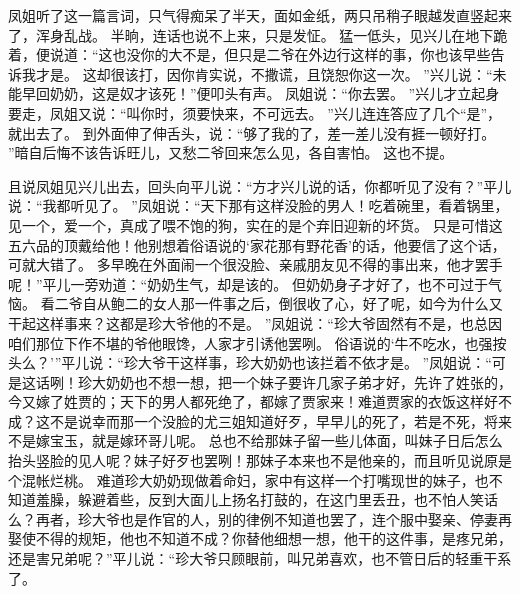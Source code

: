 \par
凤姐听了这一篇言词，只气得痴呆了半天，面如金纸，两只吊稍子眼越发直竖起来了，浑身乱战。
半晌，连话也说不上来，只是发怔。
猛一低头，见兴儿在地下跪着，便说道：“这也没你的大不是，但只是二爷在外边行这样的事，你也该早些告诉我才是。
这却很该打，因你肯实说，不撒谎，且饶恕你这一次。
”兴儿说：“未能早回奶奶，这是奴才该死！”便叩头有声。
凤姐说：“你去罢。
”兴儿才立起身要走，凤姐又说：“叫你时，须要快来，不可远去。
”兴儿连连答应了几个“是”，就出去了。
到外面伸了伸舌头，说：“够了我的了，差一差儿没有捱一顿好打。
”暗自后悔不该告诉旺儿，又愁二爷回来怎么见，各自害怕。
这也不提。
\par
且说凤姐见兴儿出去，回头向平儿说：“方才兴儿说的话，你都听见了没有？”平儿说：“我都听见了。
”凤姐说：“天下那有这样没脸的男人！吃着碗里，看着锅里，见一个，爱一个，真成了喂不饱的狗，实在的是个弃旧迎新的坏货。
只是可惜这五六品的顶戴给他！他别想着俗语说的‘家花那有野花香’的话，他要信了这个话，可就大错了。
多早晚在外面闹一个很没脸、亲戚朋友见不得的事出来，他才罢手呢！”平儿一旁劝道：“奶奶生气，却是该的。
但奶奶身子才好了，也不可过于气恼。
看二爷自从鲍二的女人那一件事之后，倒很收了心，好了呢，如今为什么又干起这样事来？这都是珍大爷他的不是。
”凤姐说：“珍大爷固然有不是，也总因咱们那位下作不堪的爷他眼馋，人家才引诱他罢咧。
俗语说的‘牛不吃水，也强按头么？’”平儿说：“珍大爷干这样事，珍大奶奶也该拦着不依才是。
”凤姐说：“可是这话咧！珍大奶奶也不想一想，把一个妹子要许几家子弟才好，先许了姓张的，今又嫁了姓贾的；天下的男人都死绝了，都嫁了贾家来！难道贾家的衣饭这样好不成？这不是说幸而那一个没脸的尤三姐知道好歹，早早儿的死了，若是不死，将来不是嫁宝玉，就是嫁环哥儿呢。
总也不给那妹子留一些儿体面，叫妹子日后怎么抬头竖脸的见人呢？妹子好歹也罢咧！那妹子本来也不是他亲的，而且听见说原是个混帐烂桃。
难道珍大奶奶现做着命妇，家中有这样一个打嘴现世的妹子，也不知道羞臊，躲避着些，反到大面儿上扬名打鼓的，在这门里丢丑，也不怕人笑话么？再者，珍大爷也是作官的人，别的律例不知道也罢了，连个服中娶亲、停妻再娶使不得的规矩，他也不知道不成？你替他细想一想，他干的这件事，是疼兄弟，还是害兄弟呢？”平儿说：“珍大爷只顾眼前，叫兄弟喜欢，也不管日后的轻重干系了。
